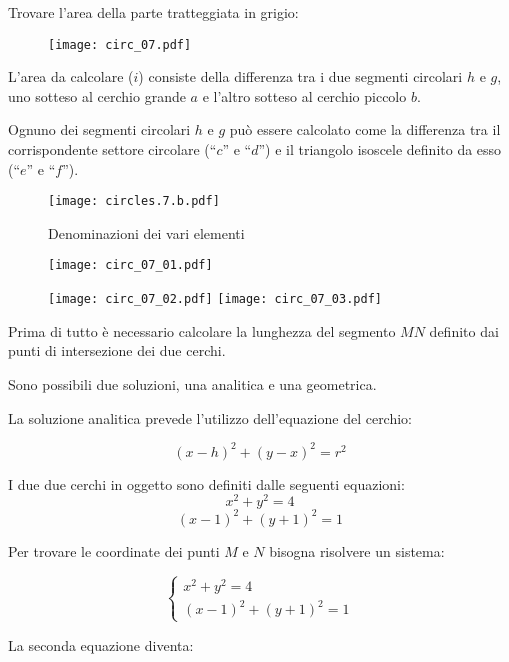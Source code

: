 Trovare l'area della parte tratteggiata in grigio:

\begin{figure}[H]
\centering
\texttt{[image: circ\_07.pdf]}
\end{figure}



L'area da calcolare ($i$) consiste della differenza tra i due segmenti circolari
$h$ e $g$, uno sotteso al cerchio grande $a$ e l'altro sotteso al cerchio
piccolo $b$.

Ognuno dei segmenti circolari $h$ e $g$ può essere calcolato come la 
differenza tra il corrispondente settore circolare (``$c$'' e ``$d$'') e 
il triangolo isoscele definito da esso (``$e$'' e ``$f$'').

\begin{figure}[H]
\centering
\texttt{[image: circles.7.b.pdf]}
\caption{Denominazioni dei vari elementi}
\label{fig:denom}
\end{figure}



\begin{figure}[H]
\centering
\texttt{[image: circ\_07\_01.pdf]}
\end{figure}


\begin{figure}[H]
\centering
\texttt{[image: circ\_07\_02.pdf]}
\texttt{[image: circ\_07\_03.pdf]}
\end{figure}

Prima di tutto è necessario calcolare la lunghezza del 
segmento $MN$ definito dai punti di intersezione dei due cerchi.

Sono possibili due soluzioni, una analitica e una geometrica.

La soluzione analitica prevede l'utilizzo 
dell'equazione del cerchio:

\[ (x-h)^2+(y-x)^2=r^2 \]

I due due cerchi in oggetto sono definiti dalle seguenti equazioni:
\[ x^2+y^2=4 \]
\[ (x-1)^2+(y+1)^2=1 \]

Per trovare le coordinate dei punti $M$ e $N$ 
bisogna risolvere un sistema:

\[
\left\{
\begin{array}{ll}
x^2+y^2=4 \\
(x-1)^2+(y+1)^2=1
\end{array}
\right.
\]

La seconda equazione diventa:

